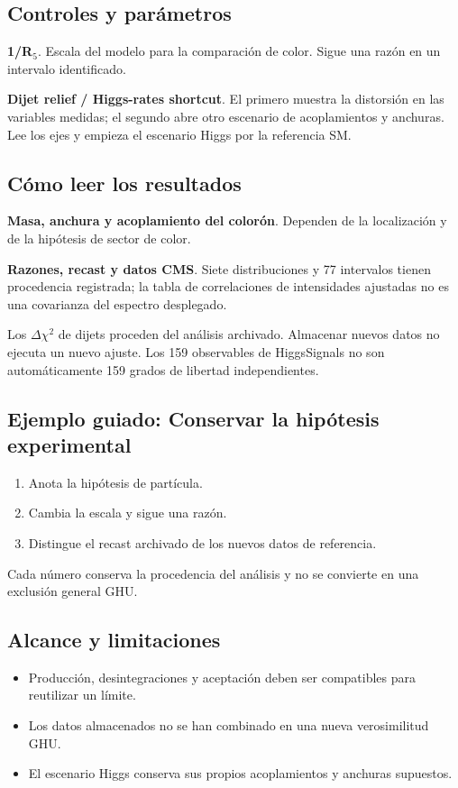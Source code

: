 \documentclass[11pt,a4paper]{article}
\begin{document}
\subsection*{Controles y parámetros}
\textbf{1/R\ensuremath{{}_{5}}}. Escala del modelo para la comparación de color. Sigue una razón en un intervalo identificado.

\textbf{Dijet relief / Higgs-rates shortcut}. El primero muestra la distorsión en las variables medidas; el segundo abre otro escenario de acoplamientos y anchuras. Lee los ejes y empieza el escenario Higgs por la referencia SM.

\subsection*{Cómo leer los resultados}
\textbf{Masa, anchura y acoplamiento del colorón}. Dependen de la localización y de la hipótesis de sector de color.

\textbf{Razones, recast y datos CMS}. Siete distribuciones y 77 intervalos tienen procedencia registrada; la tabla de correlaciones de intensidades ajustadas no es una covarianza del espectro desplegado.

Los \ensuremath{\Delta}\ensuremath{\chi}\ensuremath{{}^{2}} de dijets proceden del análisis archivado. Almacenar nuevos datos no ejecuta un nuevo ajuste. Los 159 observables de HiggsSignals no son automáticamente 159 grados de libertad independientes.
\subsection*{Ejemplo guiado: Conservar la hipótesis experimental}
\begin{enumerate}
\item Anota la hipótesis de partícula.
\item Cambia la escala y sigue una razón.
\item Distingue el recast archivado de los nuevos datos de referencia.
\end{enumerate}
Cada número conserva la procedencia del análisis y no se convierte en una exclusión general GHU.
\subsection*{Alcance y limitaciones}
\begin{itemize}
\item Producción, desintegraciones y aceptación deben ser compatibles para reutilizar un límite.
\item Los datos almacenados no se han combinado en una nueva verosimilitud GHU.
\item El escenario Higgs conserva sus propios acoplamientos y anchuras supuestos.
\end{itemize}
\end{document}
